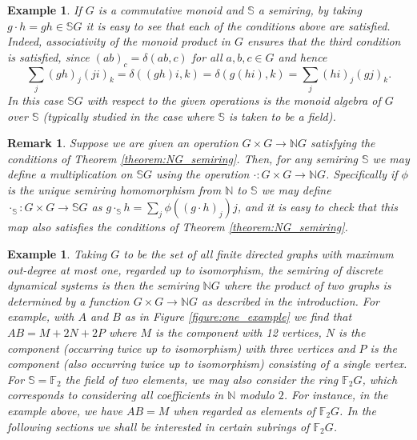 \documentclass[a4paper, 11pt]{article}
\theoremstyle{plain}
\newtheorem{example}    [theorem]{Example}
\newtheorem{remark}     [theorem]{Remark}
\theoremstyle{definition}
\newcommand{\N} {\mathbb{N}}
\begin{document}
\begin{example}\label{example:semigroup_rings}
If $G$ is a commutative monoid and $\mathbb{S}$ a semiring, by taking $g \cdot h = gh \in \mathbb{S}G$ it is easy to see that each of the conditions above are satisfied. Indeed,  associativity of the monoid product in $G$ ensures that the third condition is satisfied, since $(ab)_c = \delta( ab, c )$ for all $a, b, c \in G$ and hence
\[
    \sum_j (gh)_j (ji)_k = \delta( (gh)i, k ) = \delta( g(hi), k ) = \sum_j (hi)_j (gj)_k.
\]
In this case $\mathbb{S}G$ with respect to the given operations is the monoid algebra of $G$ over $\mathbb{S}$ (typically studied in the case where $\mathbb{S}$ is taken to be a field).     
\end{example}

\begin{remark}\label{remark:SG_semiring}
Suppose we are given an operation $G\times G \rightarrow \N G$ satisfying the conditions of Theorem \ref{theorem:NG_semiring}. Then, for any semiring $\mathbb{S}$  we may define a multiplication on $\mathbb{S}G$ using the operation $\cdot: G \times G \rightarrow \N G$. Specifically if $\phi$ is the unique semiring homomorphism from $\N$ to $\mathbb{S}$ we may define $\cdot_\mathbb{S} : G \times G \to \mathbb{S}G$ as $g \cdot_\mathbb{S} h = \sum_j \phi( (g\cdot h)_j ) j$, and it is easy to check that this map also satisfies the conditions of Theorem \ref{theorem:NG_semiring}.
\end{remark}

\begin{example}
Taking $G$ to be the set of all finite directed graphs with maximum out-degree at most one, regarded up to isomorphism, the semiring of discrete dynamical systems is then the semiring $\N G$ where the product of two graphs is determined by a function $G \times G \rightarrow \N G$ as described in the introduction. For example, with $A$ and $B$ as in Figure \ref{figure:one_example} we find that $AB = M + 2N + 2 P$ where $M$ is the component with 12 vertices, $N$ is the component (occurring twice up to isomorphism) with three vertices and $P$ is the component (also occurring twice up to isomorphism) consisting of a single vertex. For $\mathbb{S} = \mathbb{F}_2$ the field of two elements, we may also consider the ring $\mathbb{F}_2 G$, which corresponds to considering all coefficients in $\N$ modulo $2$. For instance, in the example above, we have $AB = M$ when regarded as elements of $\mathbb{F}_2 G$.  In the following sections we shall be interested in certain subrings of $\mathbb{F}_2 G$.
\end{example}
\end{document}
